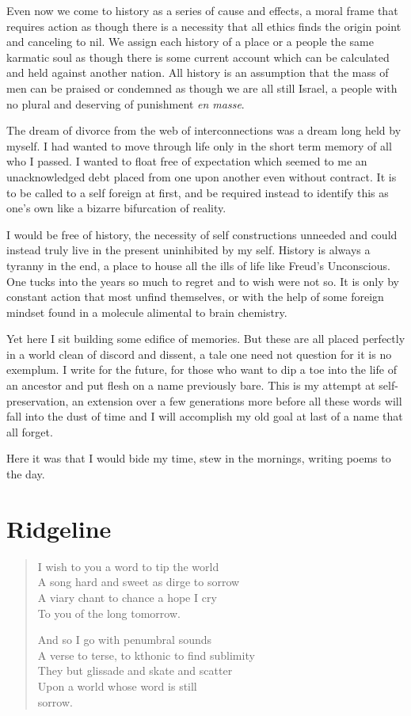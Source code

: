\documentclass[ebook, 10pt, openright, onecolumn]{memoir}
\newcommand*\td[1]{
  \todo[inline]{
     #1 
  }
}
\newcommand*\finish{\td{ ----- Finish this section -----}}
\newenvironment{poetry}
{
  \begin{quote}
    \begin{itshape}
      \small
    }
    {
    \end{itshape}
  \end{quote}
}
\begin{document}
Even now we come to history as a series of cause and effects, a moral frame that
requires action as though there is a necessity that all ethics finds the origin
point and canceling to nil.  We assign each history of a place or a people the
same karmatic soul as though there is some current account which can be
calculated and held against another nation.  All history is an assumption that
the mass of men can be praised or condemned as though we are all still Israel, a
people with no plural and deserving of punishment \textit{en masse}.

\finish

The dream of divorce from the web of interconnections was a dream long held by
myself.  I had wanted to move through life only in the short term memory of all
who I passed.  I wanted to float free of expectation which seemed to me an
unacknowledged debt placed from one upon another even without contract.  It is
to be called to a self foreign at first, and be required instead to identify
this as one's own like a bizarre bifurcation of reality.

I would be free of history, the necessity of self constructions unneeded and
could instead truly live in the present uninhibited by my self.  History is
always a tyranny in the end, a place to house all the ills of life like Freud's
Unconscious.  One tucks into the years so much to regret and to wish were not
so.  It is only by constant action that most unfind themselves, or with the help
of some foreign mindset found in a molecule alimental to brain chemistry.

Yet here I sit building some edifice of memories.  But these are all placed
perfectly in a world clean of discord and dissent, a tale one need not question
for it is no exemplum.  I write for the future, for those who want to dip a toe
into the life of an ancestor and put flesh on a name previously bare.  This is
my attempt at self-preservation, an extension over a few generations more before
all these words will fall into the dust of time and I will accomplish my old
goal at last of a name that all forget.

Here it was that I would bide my time, stew in the mornings, writing poems to the
day.

\chapter{Ridgeline}
\label{cha:ridgeline}

\begin{poetry}
  I wish to you a word to tip the world\\
  A song hard and sweet as dirge to sorrow\\
  A viary chant to chance a hope I cry\\
  To you of the long tomorrow.

  And so I go with penumbral sounds\\
  A verse to terse, to kthonic to find sublimity\\
  They but glissade and skate and scatter\\
  Upon a world whose word is still\\
  sorrow.
\end{poetry}
\end{document}
